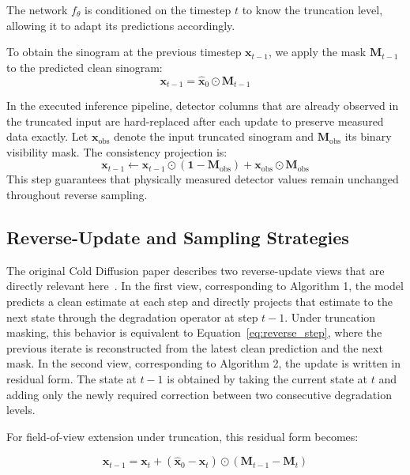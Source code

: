 The network $f_\theta$ is conditioned on the timestep $t$ to know the truncation level, allowing it to adapt its predictions accordingly.

To obtain the sinogram at the previous timestep $\mathbf{x}_{t-1}$, we apply the mask $\mathbf{M}_{t-1}$ to the predicted clean sinogram:
%
\begin{equation}
\mathbf{x}_{t-1} = \hat{\mathbf{x}}_0 \odot \mathbf{M}_{t-1}
\label{eq:reverse_step}
\end{equation}

In the executed inference pipeline, detector columns that are already observed in the truncated input are hard-replaced after each update to preserve measured data exactly. Let $\mathbf{x}_{\text{obs}}$ denote the input truncated sinogram and $\mathbf{M}_{\text{obs}}$ its binary visibility mask. The consistency projection is:
%
\begin{equation}
\mathbf{x}_{t-1} \leftarrow \mathbf{x}_{t-1} \odot (\mathbf{1} - \mathbf{M}_{\text{obs}}) + \mathbf{x}_{\text{obs}} \odot \mathbf{M}_{\text{obs}}
\label{eq:hard_replacement_observed}
\end{equation}
%
This step guarantees that physically measured detector values remain unchanged throughout reverse sampling.

\subsection{Reverse-Update and Sampling Strategies}
\label{sec:sampling_strategies}

The original Cold Diffusion paper describes two reverse-update views that are directly relevant here~\cite{bansal2022cold}. In the first view, corresponding to Algorithm 1, the model predicts a clean estimate at each step and directly projects that estimate to the next state through the degradation operator at step $t-1$. Under truncation masking, this behavior is equivalent to Equation~\ref{eq:reverse_step}, where the previous iterate is reconstructed from the latest clean prediction and the next mask. In the second view, corresponding to Algorithm 2, the update is written in residual form. The state at $t-1$ is obtained by taking the current state at $t$ and adding only the newly required correction between two consecutive degradation levels.

For field-of-view extension under truncation, this residual form becomes:

\begin{equation}
\mathbf{x}_{t-1} = \mathbf{x}_t + (\hat{\mathbf{x}}_0 - \mathbf{x}_t) \odot (\mathbf{M}_{t-1} - \mathbf{M}_t)
\label{eq:algo2_residual_update}
\end{equation}

